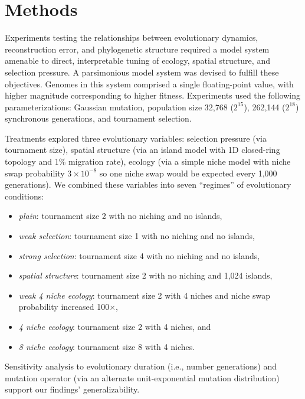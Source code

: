 \vspace{-1.5ex}
\section{Methods}

Experiments testing the relationships between evolutionary dynamics, reconstruction error, and phylogenetic structure required a model system amenable to direct, interpretable tuning of ecology, spatial structure, and selection pressure.
A parsimonious model system was devised to fulfill these objectives.
Genomes in this system comprised a single floating-point value, with higher magnitude corresponding to higher fitness.
Experiments used the following parameterizations: Gaussian mutation, population size 32,768 ($2^{15}$), 262,144 ($2^{18}$) synchronous generations, and tournament selection.

Treatments explored three evolutionary variables: selection pressure (via tournament size), spatial structure (via an island model with 1D closed-ring topology and 1\% migration rate), ecology (via a simple niche model with niche swap probability $3 \times 10^{-8}$ so one niche swap would be expected every 1,000 generations).
We combined these variables into seven ``regimes'' of evolutionary conditions:

\begin{minipage}[t]{\columnwidth}
\begin{itemize}
  \item \textit{plain}: tournament size 2 with no niching and no islands,
  \item \textit{weak selection}: tournament size 1 with no niching and no islands,
  \item \textit{strong selection}: tournament size 4 with no niching and no islands,
  \item \textit{spatial structure}: tournament size 2 with no niching and 1,024 islands,
  \item \textit{weak 4 niche ecology}: tournament size 2 with 4 niches and niche swap probability increased 100$\times$,
  \item \textit{4 niche ecology}: tournament size 2 with 4 niches, and
  \item \textit{8 niche ecology}: tournament size 8 with 4 niches.
\end{itemize}
\end{minipage}

Sensitivity analysis to evolutionary duration (i.e., number generations) and mutation operator (via an alternate unit-exponential mutation distribution) support our findings' generalizability.

